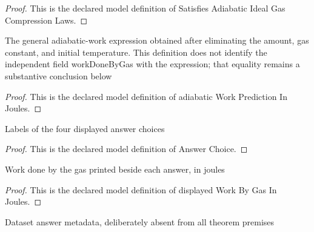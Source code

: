 \begin{proof}
  This is the declared model definition of Satisfies Adiabatic Ideal Gas Compression Laws.
\end{proof}
\begin{definition}
  \label{def:physics:phyx-mini-0472:phyxminiproblems-problemphyxmini0472-adiabaticworkpredictioninjoules}
  The general adiabatic-work expression obtained after eliminating the amount, gas constant, and initial temperature. This definition does not identify the independent field workDoneByGas with the expression; that equality remains a substantive conclusion below
\end{definition}
\begin{proof}
  This is the declared model definition of adiabatic Work Prediction In Joules.
\end{proof}
\begin{definition}
  \label{def:physics:phyx-mini-0472:phyxminiproblems-problemphyxmini0472-answerchoice}
  Labels of the four displayed answer choices
\end{definition}
\begin{proof}
  This is the declared model definition of Answer Choice.
\end{proof}
\begin{definition}
  \label{def:physics:phyx-mini-0472:phyxminiproblems-problemphyxmini0472-displayedworkbygasinjoules}
  Work done by the gas printed beside each answer, in joules
\end{definition}
\begin{proof}
  This is the declared model definition of displayed Work By Gas In Joules.
\end{proof}
\begin{definition}
  \label{def:physics:phyx-mini-0472:phyxminiproblems-problemphyxmini0472-recordeddatasetanswer}
  Dataset answer metadata, deliberately absent from all theorem premises
\end{definition}
